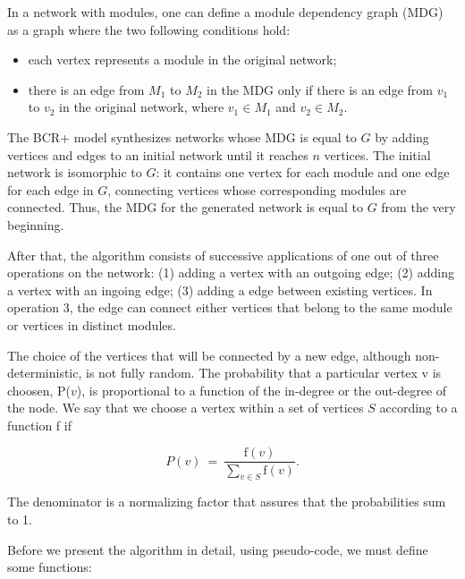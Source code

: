 In a network with modules, one can define a module dependency graph (MDG) as a
graph where the two following conditions hold: 

\begin{itemize}
\item each vertex represents a module in the original network; 
\item there is an edge from $M_1$ to $M_2$ in the MDG only if there is an edge
from $v_1$ to $v_2$ in the original network, where $v_1 \in M_1$ and $v_2 \in
M_2$.
\end{itemize}

The BCR+ model synthesizes networks whose MDG is equal to $G$ by adding vertices
and edges to an initial network until it reaches $n$ vertices. The initial
network is isomorphic to $G$: it contains one vertex for each module and one
edge for each edge in $G$, connecting vertices whose corresponding modules are
connected. Thus, the MDG for the generated network is equal to $G$ from the very
beginning.

After that, the algorithm consists of successive applications of one out of
three operations on the network: (1) adding a vertex with an outgoing edge; (2)
adding a vertex with an ingoing edge; (3) adding a edge between existing
vertices. In operation 3, the edge can connect either vertices that belong
to the same module or vertices in distinct modules. 

The choice of the vertices that will be connected by a new edge, although
non-deterministic, is not fully random. The probability that a particular vertex
v is choosen, P($v$), is proportional to a function of the in-degree or the
out-degree of the node. We say that we choose a vertex within a set of vertices
$S$ according to a function f if

$$
  P(v) ~=~ \frac{ \mathrm{f}(v) }{ \displaystyle\sum_{v \in S} \mathrm{f}(v) }.
$$

The denominator is a normalizing factor that assures that the probabilities sum
to 1.

Before we present the algorithm in detail, using pseudo-code, we must define
some functions:


